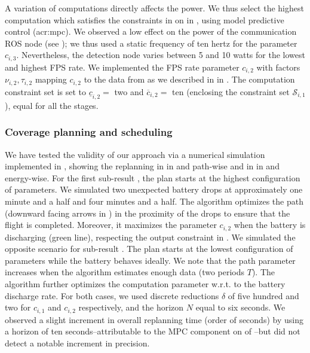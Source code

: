 A variation of computations directly affects the power. We thus select the highest computation which satisfies the constraints in  on  in , using model predictive control (\Gls{acr:mpc}). We observed a low effect on the power of the communication ROS node (see ); we thus used a static frequency of ten hertz for the parameter $c_{i,3}$. Nevertheless, the detection node varies between 5 and 10 watts for the lowest and highest FPS rate. We implemented the FPS rate parameter $c_{i,2}$ with factors  $\nu_{i,2},\tau_{i,2}$ mapping $c_{i,2}$ to the data from \powprof{} as we described in  in . The computation constraint set is set to $\underline{c}_{i,2}=$ two and $\overline{c}_{i,2}=$ ten (enclosing the constraint set $\mathcal{S}_{i,1}$), equal for all the stages.

\subsubsection*{Coverage planning and scheduling}

We have tested the validity of our approach via a numerical simulation implemented in \matlab, showing the replanning in  in  and  path-wise and in  in  and  energy-wise. For the first sub-result , the plan starts at the highest configuration of parameters. We simulated two unexpected battery drops at approximately one minute and a half and four minutes and a half. The algorithm optimizes the path (downward facing arrows in ) in the proximity of the drops to ensure that the flight is completed. Moreover, it maximizes the parameter $c_{i,2}$ when the battery is discharging (green line), respecting the output constraint in . We simulated the opposite scenario for sub-result . The plan starts at the lowest configuration of parameters while the battery behaves ideally. We note that the path parameter increases when the algorithm estimates enough data (two periods $T$). The algorithm further optimizes the computation parameter w.r.t. to the battery discharge rate. For both cases, we used discrete reductions $\delta$ of five hundred and two for $c_{i,1}$ and $c_{i,2}$ respectively, and the horizon $N$ equal to six seconds. We observed a slight increment in overall replanning time (order of seconds) by using a horizon of ten seconds--attributable to the MPC component on  of --but did not detect a notable increment in precision. 


